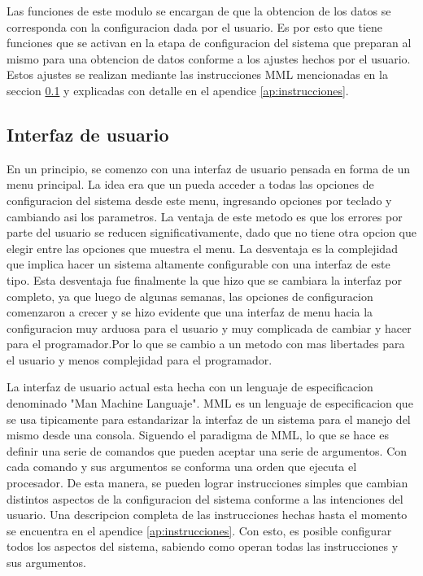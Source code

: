 Las funciones de este modulo se encargan de que la obtencion de los datos se corresponda con la configuracion dada por el usuario. Es por esto que tiene funciones que se activan en la etapa de configuracion del sistema que preparan al mismo para una obtencion de datos conforme a los ajustes hechos por el usuario. Estos ajustes se realizan mediante las instrucciones MML mencionadas en la seccion \ref{sub:interfaz_de_usuario} y explicadas con detalle en el apendice \ref{ap:instrucciones}.


\subsection{Interfaz de usuario} %
\label{sub:interfaz_de_usuario}


En un principio, se comenzo con una interfaz de usuario pensada en forma de un menu principal. La idea era que un pueda acceder a todas las opciones de configuracion del sistema desde este menu, ingresando opciones por teclado y cambiando asi los parametros. La ventaja de este metodo es que los errores por parte del usuario se reducen significativamente, dado que no tiene otra opcion que elegir entre las opciones que muestra el menu. La desventaja es la complejidad que implica hacer un sistema altamente configurable con una interfaz de este tipo. Esta desventaja fue finalmente la que hizo que se cambiara la interfaz por completo, ya que luego de algunas semanas, las opciones de configuracion comenzaron a crecer y se hizo evidente que una interfaz de menu hacia la configuracion muy arduosa para el usuario y muy complicada de cambiar y hacer para el programador.Por lo que se cambio a un metodo con mas libertades para el usuario y menos complejidad para el programador.

La interfaz de usuario actual esta hecha con un lenguaje de especificacion denominado "Man Machine Languaje". MML es un lenguaje de especificacion que se usa tipicamente para estandarizar la interfaz de un sistema para el manejo del mismo desde una consola. Siguendo el paradigma de MML, lo que se hace es definir una serie de comandos que pueden aceptar una serie de argumentos. Con cada comando y sus argumentos se conforma una orden que ejecuta el procesador. De esta manera, se pueden lograr instrucciones simples que cambian distintos aspectos de la configuracion del sistema conforme a las intenciones del usuario. Una descripcion completa de las instrucciones hechas hasta el momento se encuentra en el apendice \ref{ap:instrucciones}. Con esto, es posible configurar todos los aspectos del sistema, sabiendo como operan todas las instrucciones y sus argumentos.

